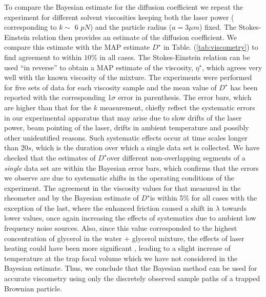 \documentclass[english,aps, twocolumn, pre,superscriptaddress]{revtex4-1}
\begin{document}
To compare the Bayesian estimate for the diffusion coefficient we
repeat the experiment for different solvent viscosities keeping both
the laser power ( corresponding to $k\sim$ 6 $pN$) and the particle
radius ($a=3\mu m$) fixed. The Stokes-Einstein relation then provides
an estimate of the diffusion coefficient. We compare this estimate
with the MAP estimate $D^{\star}$ in Table. (\ref{tab:viscometry})
to find agreement to within $10\%$ in all cases. The Stokes-Einstein
relation can be used ``in reverse'' to obtain a MAP estimate of
the viscosity, $\eta^{\star}$, which agrees very well with the known
viscosity of the mixture. The experiments were performed for five
sets of data for each viscosity sample and the mean value of $D^{\star}$
has been reported with the corresponding 1$\sigma$ error in parenthesis.
The error bars, which are higher than that for the $k$ measurement,
chiefly reflect the systematic errors in our experimental apparatus
that may arise due to slow drifts of the laser power, beam pointing
of the laser, drifts in ambient temperature and possibly other unidentified
reasons. Such systematic effects occur at time scales longer than
$20s$, which is the duration over which a single data set is collected.
We have checked that the estimates of $D^{\star}$over different non-overlapping
segments of a \emph{single }data set are within the Bayesian error
bars, which confirms that the errors we observe are due to systematic
shifts in the operating conditions of the experiment. The agreement
in the viscosity values for that measured in the rheometer and by
the Bayesian estimate of $D^{\star}$is within 5\% for all cases with
the exception of the last, where the enhanced friction caused a shift
in $\lambda$ towards lower values, once again increasing the effects
of systematics due to ambient low frequency noise sources. Also, since
this value corresponded to the highest concentration of glycerol in
the water + glycerol mixture, the effects of laser heating could have
been more significant \cite{schmidt03heating}, leading to a slight
increase of temperature at the trap focal volume which we have not
considered in the Bayesian estimate. Thus, we conclude that the Bayesian
method can be used for accurate viscometry using only the discretely
observed sample paths of a trapped Brownian particle.
\end{document}
